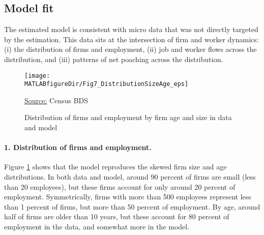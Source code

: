 \subsection{Model fit}\label{sec: nontargeted}
The estimated model is consistent with micro data that was not directly targeted by the estimation.
This data sits at the intersection of firm and worker dynamics:
(i) the distribution of firms and employment, (ii) job and worker flows across the distribution, and (iii) patterns of net poaching across the distribution.


\begin{figure}[t!]
\begin{center}
\hspace*{-0.5cm}\texttt{[image: \\MATLABfigureDir/Fig7\_DistributionSizeAge\_eps]}
\caption{Distribution of firms and employment by firm age and size in data and model}\label{figure:_AgeSize}\vspace*{-.3cm}
\end{center}
{\footnotesize \underline{Source:}
Census BDS
}
\end{figure}

\paragraph{1. Distribution of firms and employment.}
Figure \ref{figure:_AgeSize} shows that the model reproduces the skewed firm size and age distributions.
In both data and model, around 90 percent of firms are small (less than 20 employees), but these firms account for only around 20 percent of employment.
Symmetrically, firms with more than 500 employees represent less than 1 percent of firms, but more than 50 percent of employment.
By age, around half of firms are older than 10 years, but these account for 80 percent of employment in the data, and somewhat more in the model.

